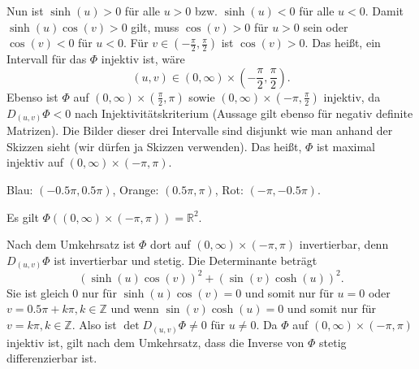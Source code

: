 \documentclass[a4paper]{article}
\theoremstyle{plain}
\begin{document}
\begin{enumerate}[label=(\roman*)]
	Nun ist $\sinh(u) > 0$ für alle $u > 0$ bzw. $\sinh(u) < 0$ für alle $u < 0$. Damit $\sinh(u)\cos(v) > 0$ gilt, muss $\cos(v) > 0$ für $ u > 0$ sein oder $\cos(v) < 0$ für $u < 0$. Für $v \in (-\frac{\pi}{2}, \frac{\pi}{2})$ ist $\cos(v) > 0$. Das heißt, ein Intervall für das $\Phi$ injektiv ist, wäre
	\[
		(u,v) \in (0, \infty) \times (-\frac{\pi}{2}, \frac{\pi}{2}).
	\]
	Ebenso ist $\Phi$ auf $(0, \infty) \times (\frac{\pi}{2}, \pi)$ sowie $(0, \infty) \times (-\pi,\frac{\pi}{2})$ injektiv, da $D_{(u,v)}\Phi <0$ nach Injektivitätskriterium (Aussage gilt ebenso für negativ definite Matrizen). Die Bilder dieser drei Intervalle sind disjunkt wie man anhand der Skizzen sieht (wir dürfen ja Skizzen verwenden). Das heißt, $\Phi$ ist maximal injektiv auf $(0, \infty) \times (-\pi, \pi)$.
	\begin{center}
	\end{center}
	Blau: $(-0.5\pi, 0.5\pi)$, Orange: $(0.5\pi, \pi)$, Rot: $(-\pi, -0.5\pi)$. 
	
	Es gilt $\Phi((0, \infty) \times (-\pi, \pi)) = \mathbb R^2$.
	
	Nach dem Umkehrsatz ist $\Phi$ dort auf $(0, \infty) \times (-\pi, \pi)$ invertierbar, denn $D_{(u,v)}\Phi$ ist invertierbar und stetig. Die Determinante beträgt
	\[
		(\sinh(u)\cos(v))^2 + (\sin(v)\cosh(u))^2.
	\]
	Sie ist gleich $0$ nur für $\sinh(u)\cos(v) = 0$ und somit nur für $u=0$ oder $v = 0.5\pi + k\pi, k \in \mathbb Z$ und wenn $\sin(v)\cosh(u)=0$ und somit nur für $v = k\pi, k \in \mathbb Z$. Also ist $\det D_{(u,v)}\Phi \neq 0$ für $u \neq 0$. Da $\Phi$ auf $(0, \infty) \times (-\pi, \pi)$ injektiv ist, gilt nach dem Umkehrsatz, dass die Inverse von $\Phi$ stetig differenzierbar ist.
	

\end{enumerate}
\end{document}
